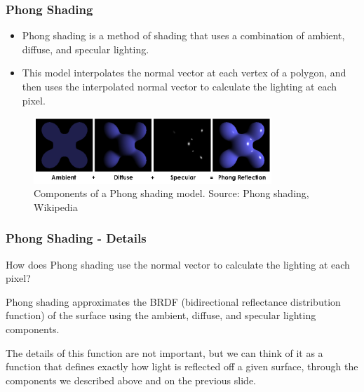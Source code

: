\documentclass{beamer}
\begin{document}
  \begin{frame}
    \frametitle{Phong Shading}
    \begin{itemize}
      \item Phong shading is a method of shading that uses a combination of ambient, diffuse, and specular lighting.
      \item This model interpolates the normal vector at each vertex of a polygon, and then uses the interpolated normal vector to calculate the lighting at each pixel.
    \end{itemize}

    \begin{figure}
      \centering
      \includegraphics[width=0.8\textwidth]{Phong_components_version_4.png}
      \caption{Components of a Phong shading model. Source: Phong shading, Wikipedia}
      \label{fig:phong}
    \end{figure}

  \end{frame}

  \begin{frame}
    \frametitle{Phong Shading - Details}
    How does Phong shading use the normal vector to calculate the lighting at each pixel?

    Phong shading approximates the BRDF (bidirectional reflectance distribution function) of the surface using the ambient, diffuse, and specular lighting components.

    The details of this function are not important, but we can think of it as a function that defines exactly how light is reflected off a given surface, through the components we described above and on the previous slide.





  \end{frame}
\end{document}
